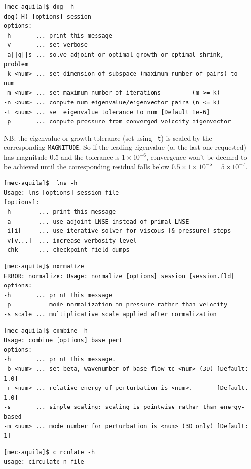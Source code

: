\documentclass[11pt,a4paper]{report}
\begin{document}
{\small
\begin{verbatim}
[mec-aquila]$ dog -h
dog(-H) [options] session
options:
-h       ... print this message
-v       ... set verbose
-a||g||s ... solve adjoint or optimal growth or optimal shrink, problem
-k <num> ... set dimension of subspace (maximum number of pairs) to num
-m <num> ... set maximum number of iterations         (m >= k)
-n <num> ... compute num eigenvalue/eigenvector pairs (n <= k)
-t <num> ... set eigenvalue tolerance to num [Default 1e-6]
-p       ... compute pressure from converged velocity eigenvector
\end{verbatim}
}
NB: the eigenvalue or growth tolerance (set using \verb+-t+) is
scaled by the corresponding \verb+MAGNITUDE+.  So if the leading
eigenvalue (or the last one requested) has magnitude 0.5 and the
tolerance is $1\times10^{-6}$, convergence won't be deemed to be
achieved until the corresponding residual falls below
$0.5\times1\times10^{-6}=5\times10^{-7}$.

{\small
\begin{verbatim}
[mec-aquila]$  lns -h
Usage: lns [options] session-file
[options]:
-h        ... print this message
-a        ... use adjoint LNSE instead of primal LNSE
-i[i]     ... use iterative solver for viscous [& pressure] steps
-v[v...]  ... increase verbosity level
-chk      ... checkpoint field dumps
\end{verbatim}
}

{\small
\begin{verbatim}
[mec-aquila]$ normalize
ERROR: normalize: Usage: normalize [options] session [session.fld]
options:
-h       ... print this message
-p       ... mode normalization on pressure rather than velocity
-s scale ... multiplicative scale applied after normalization
\end{verbatim}
}

{\small
\begin{verbatim}
[mec-aquila]$ combine -h
Usage: combine [options] base pert
options:
-h       ... print this message.
-b <num> ... set beta, wavenumber of base flow to <num> (3D) [Default: 1.0]
-r <num> ... relative energy of perturbation is <num>.       [Default: 1.0]
-s       ... simple scaling: scaling is pointwise rather than energy-based
-m <num> ... mode number for perturbation is <num> (3D only) [Default: 1]
\end{verbatim}
}

{\small
\begin{verbatim}
[mec-aquila]$ circulate -h
usage: circulate n file
\end{verbatim}
}
\end{document}
